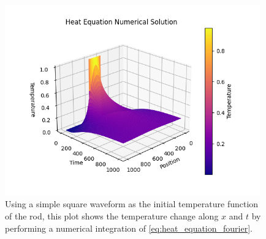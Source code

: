 \begin{figure}[H]
    \centering
    \includegraphics[width=110mm,height=\textheight,keepaspectratio]{images/heat_equation_numerical.png}
    \caption{Using a simple square waveform as the initial temperature function of the rod, this plot shows the temperature change along \(x\) and \(t\) by performing a numerical integration of \cref{eq:heat_equation_fourier}.}
    \label{fig:heat_equation_numerical}
\end{figure}

